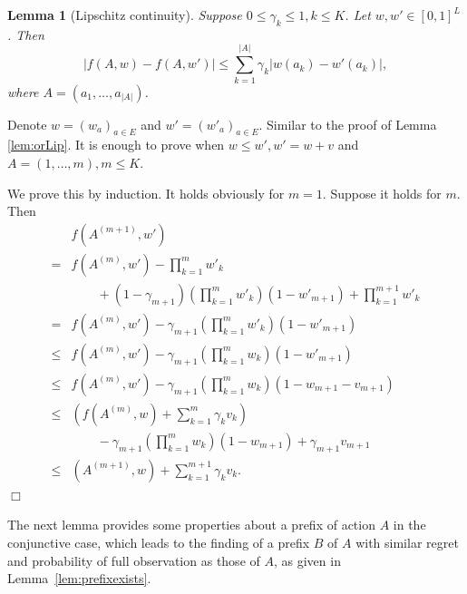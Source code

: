 \documentclass{article}
\newtheorem{lemma}[theorem]{Lemma}%
\newenvironment{proof}{\noindent {\textbf{Proof. }}}{$\Box$ \medskip}
\begin{document}
\begin{lemma}[Lipschitz continuity]
	\label{lem:andLip}
	Suppose $0 \leq \gamma_k \leq 1, k \leq K$. Let $w, w'\in [0,1]^{L}$. Then
	$$
	|f(A, w) - f(A, w')| \leq \sum_{k=1}^{|A|} \gamma_k |w(a_k) - w'(a_k)|,
	$$
	where $A = (a_1, \ldots, a_{|A|})$.
\end{lemma}
\begin{proof}
	Denote $w = (w_a)_{a \in E}$ and $w' = (w'_a)_{a \in E}$. Similar to the proof of Lemma \ref{lem:orLip}. It is enough to prove when $w \leq w', w' = w + v $ and $A = (1, \ldots, m), m \leq K$. 
	
	We prove this by induction. It holds obviously for $m = 1$. Suppose it holds for $m$. Then
	\begin{align*}
		&f(A^{(m+1)}, w') \\
		= &f(A^{(m)}, w') -\prod_{k=1}^{m} w'_k \\
		&\qquad+ (1-\gamma_{m+1}) (\prod_{k=1}^{m} w'_k) (1 - w'_{m+1})+ \prod_{k=1}^{m+1} w'_k\\
		=& f(A^{(m)}, w') - \gamma_{m+1} (\prod_{k=1}^{m} w'_k) (1 - w'_{m+1})\\
		\leq& f(A^{(m)}, w') - \gamma_{m+1} (\prod_{k=1}^{m} w_k) (1 - w'_{m+1})\\
		\leq& f(A^{(m)}, w') -\gamma_{m+1} (\prod_{k=1}^{m} w_k)  (1 - w_{m+1} - v_{m+1})\\
		\leq& (f(A^{(m)}, w) +  \sum_{k=1}^{m} \gamma_k v_k) \\
		&\qquad - \gamma_{m+1}  (\prod_{k=1}^{m} w_k)(1 - w_{m+1}) + \gamma_{m+1} v_{m+1}\\
		\leq& (A^{(m+1)}, w) + \sum_{k=1}^{m+1} \gamma_k v_k.
	\end{align*}
\end{proof}

The next lemma provides some properties about a prefix of action $A$ in the conjunctive case, which leads to the finding of a prefix $B$ of $A$ with similar regret and probability of full observation as those of $A$, as given in Lemma~\ref{lem:prefixexists}.
\end{document}

